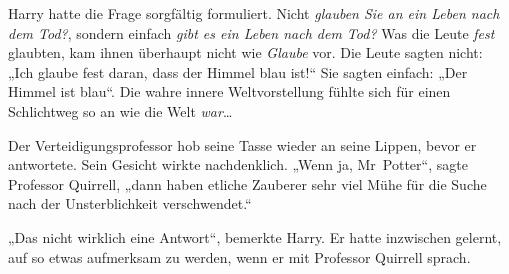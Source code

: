 Harry hatte die Frage sorgfältig formuliert. Nicht \emph{glauben Sie an ein Leben nach dem Tod?}, sondern einfach \emph{gibt es ein Leben nach dem Tod?} Was die Leute \emph{fest} glaubten, kam ihnen überhaupt nicht wie \emph{Glaube} vor. Die Leute sagten nicht:
„Ich glaube fest daran, dass der Himmel blau ist!“ Sie sagten einfach:
„Der Himmel ist blau“. Die wahre innere Weltvorstellung fühlte sich für einen Schlichtweg so an wie die Welt \emph{war}…

Der Verteidigungsprofessor hob seine Tasse wieder an seine Lippen, bevor er antwortete. Sein Gesicht wirkte nachdenklich.
„Wenn ja, Mr~Potter“, sagte Professor Quirrell, „dann haben etliche Zauberer sehr viel Mühe für die Suche nach der Unsterblichkeit verschwendet.“

„Das nicht wirklich eine Antwort“, bemerkte Harry. Er hatte inzwischen gelernt, auf so etwas aufmerksam zu werden, wenn er mit Professor Quirrell sprach.

